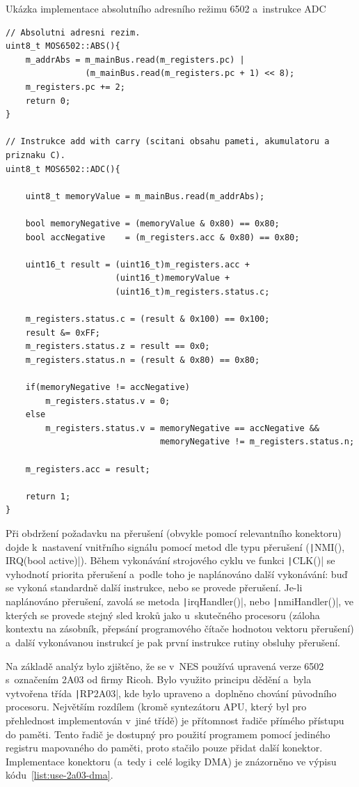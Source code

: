 \begin{listing}
	\caption{Ukázka implementace absolutního adresního režimu 6502 a~instrukce ADC}
	\label{list:use-6502-instrukce}
	\begin{verbatim}
// Absolutni adresni rezim.
uint8_t MOS6502::ABS(){
	m_addrAbs = m_mainBus.read(m_registers.pc) |
	            (m_mainBus.read(m_registers.pc + 1) << 8);
	m_registers.pc += 2;
	return 0;
}

// Instrukce add with carry (scitani obsahu pameti, akumulatoru a priznaku C).
uint8_t MOS6502::ADC(){
	
	uint8_t memoryValue = m_mainBus.read(m_addrAbs);
	
	bool memoryNegative = (memoryValue & 0x80) == 0x80;
	bool accNegative    = (m_registers.acc & 0x80) == 0x80;
	
	uint16_t result = (uint16_t)m_registers.acc +
	                  (uint16_t)memoryValue +
	                  (uint16_t)m_registers.status.c;

	m_registers.status.c = (result & 0x100) == 0x100;
	result &= 0xFF;
	m_registers.status.z = result == 0x0;
	m_registers.status.n = (result & 0x80) == 0x80;
	
	if(memoryNegative != accNegative)
		m_registers.status.v = 0;
	else
		m_registers.status.v = memoryNegative == accNegative && 
	                           memoryNegative != m_registers.status.n;
	
	m_registers.acc = result;
	
	return 1;
}
	\end{verbatim}
\end{listing}

Při obdržení požadavku na přerušení (obvykle pomocí relevantního konektoru) dojde k~nastavení vnitřního signálu pomocí metod dle typu přerušení (\texttt|NMI(), IRQ(bool active)|). Během vykonávání strojového cyklu ve funkci \texttt|CLK()| se vyhodnotí priorita přerušení a~podle toho je naplánováno další vykonávání: buď se vykoná standardně další instrukce, nebo se provede přerušení. Je-li naplánováno přerušení, zavolá se metoda \texttt|irqHandler()|, nebo \texttt|nmiHandler()|, ve kterých se provede stejný sled kroků jako u~skutečného procesoru (záloha kontextu na zásobník, přepsání programového čítače hodnotou vektoru přerušení) a~další vykonávanou instrukcí je pak první instrukce rutiny obsluhy přerušení.

Na základě analýz bylo zjištěno, že se v~NES používá upravená verze 6502 s~označením 2A03 od firmy Ricoh. Bylo využito principu dědění a~byla vytvořena třída \texttt|RP2A03|, kde bylo upraveno a~doplněno chování původního procesoru. Největším rozdílem (kromě syntezátoru APU, který byl pro přehlednost implementován v~jiné třídě) je přítomnost řadiče přímého přístupu do paměti. Tento řadič je dostupný pro použití programem pomocí jediného registru mapovaného do paměti, proto stačilo pouze přidat další konektor. Implementace konektoru (a~tedy i~celé logiky DMA) je znázorněno ve výpisu kódu~\ref{list:use-2a03-dma}.

